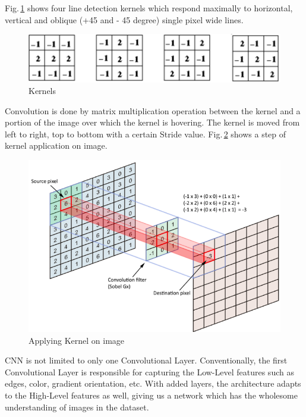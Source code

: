 Fig.\,\ref{kernels} shows four line detection kernels which respond maximally to horizontal, vertical and oblique (+45 and - 45 degree) single pixel wide lines.

\begin{figure}[h]
	\centering
	\includegraphics[scale=0.6]{Figs/kernels.png}
    \caption{Kernels}
    \label{kernels}
\end{figure}

Convolution is done by matrix multiplication operation between the kernel and a portion of the image over which the kernel is hovering. The kernel is moved from left to right, top to bottom with a certain Stride value. Fig.\,\ref{convlayer} shows a step of kernel application on image. 

\begin{figure}[h]
	\centering
	\includegraphics[scale=0.4]{Figs/convlayer.png}
    \caption{Applying Kernel on image}
    \label{convlayer}
\end{figure}


CNN is not limited to only one Convolutional Layer. Conventionally, the first Convolutional Layer is responsible for capturing the Low-Level features such as edges, color, gradient orientation, etc. With added layers, the architecture adapts to the High-Level features as well, giving us a network which has the wholesome understanding of images in the dataset.

